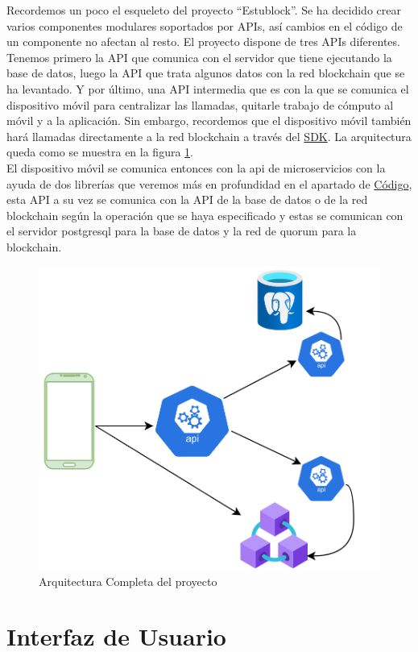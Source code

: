 Recordemos un poco el esqueleto del proyecto ``Estublock''. Se ha decidido crear varios componentes modulares soportados por APIs, así cambios en el código de un componente no afectan al resto. El proyecto dispone de tres APIs diferentes. Tenemos primero la API que comunica con el servidor que tiene ejecutando la base de datos, luego la API que trata algunos datos con la red blockchain que se ha levantado. Y por último, una API intermedia que es con la que se comunica el dispositivo móvil para centralizar las llamadas, quitarle trabajo de cómputo al móvil y a la aplicación. Sin embargo, recordemos que el dispositivo móvil también hará llamadas directamente a la red blockchain a través del \hyperref[sec:SDK]{SDK}. La arquitectura queda como se muestra en la figura \ref{fig:estublockArch}. \\

El dispositivo móvil se comunica entonces con la api de microservicios con la ayuda de dos librerías que veremos más en profundidad en el apartado de \hyperref[sec:Codigo]{Código}, esta API a su vez se comunica con la API de la base de datos o de la red blockchain según la operación que se haya especificado y estas se comunican con el servidor postgresql para la base de datos y la red de quorum para la blockchain. \\

\begin{figure}[h!]
  \centering
  \includegraphics[width=0.4\linewidth]{figs/Desarrollo/Arquitectura}
  \caption[Arquitectura]{Arquitectura Completa del proyecto}
  \label{fig:estublockArch}
\end{figure}

\section{Interfaz de Usuario}

